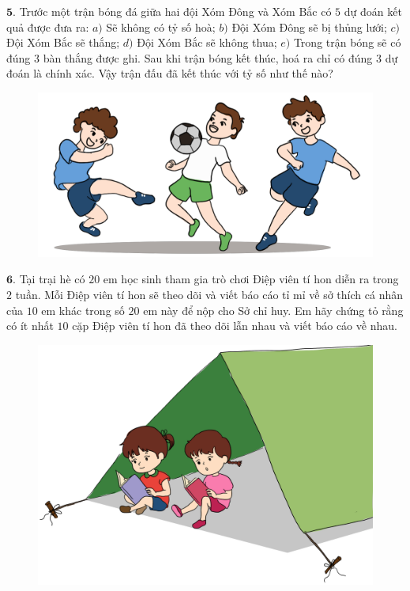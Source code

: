\begin{multicols}{2}
\begin{figure}[H]
		\vspace*{-10pt}
	\end{figure}
	$\pmb{5.}$ Trước một trận bóng đá giữa hai đội Xóm Đông và Xóm Bắc có $5$ dự đoán kết quả được đưa ra:
	\vskip 0.1cm
	$a)$	Sẽ không có tỷ số hoà;
	\vskip 0.1cm
	$b)$	Đội Xóm Đông sẽ bị thủng lưới;
	\vskip 0.1cm
	$c)$	Đội Xóm Bắc sẽ thắng;
	\vskip 0.1cm
	$d)$	Đội Xóm Bắc sẽ không thua;
	\vskip 0.1cm
	$e)$	Trong trận bóng sẽ có đúng $3$ bàn thắng được ghi.
	\vskip 0.1cm
	Sau khi trận bóng kết thúc, hoá ra chỉ có đúng $3$ dự đoán là chính xác. Vậy trận đấu đã kết thúc với tỷ số như thế nào?
	\begin{figure}[H]
		\centering
		\vspace*{-5pt}
		\captionsetup{labelformat= empty, justification=centering}
		\includegraphics[width=1\linewidth]{Pi7_bai5}
		\vspace*{-15pt}
	\end{figure}
	$\pmb{6.}$ 	Tại trại hè có $20$ em học sinh tham gia trò chơi Điệp viên tí hon diễn ra trong $2$ tuần. Mỗi Điệp viên tí hon sẽ theo dõi và viết báo cáo tỉ mỉ về sở thích cá nhân của $10$ em khác trong số $20$ em này để nộp cho Sở chỉ huy. Em hãy chứng tỏ rằng có ít nhất $10$ cặp Điệp viên tí hon đã theo dõi lẫn nhau và viết báo cáo về nhau.
	\begin{figure}[H]
		\centering
		\vspace*{-5pt}
		\captionsetup{labelformat= empty, justification=centering}
		\includegraphics[width=1\linewidth]{Pi7_bai6}
		\vspace*{-5pt}
	\end{figure}
\end{multicols}
